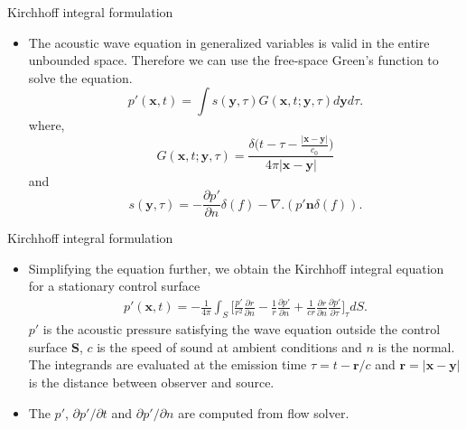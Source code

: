 \documentclass[10pt, aspectratio=169]{beamer}
\begin{document}
\begin{frame}{Kirchhoff integral formulation}
	\begin{itemize}
		\item The acoustic wave equation in generalized variables is valid in the
		entire unbounded space. Therefore we can use the free-space Green’s function to
		solve the equation.
		\begin{equation}\label{pressure}
			p'(\mathbf{x}, t) = \int s(\mathbf{y}, \tau){G(\mathbf{x}, t; \mathbf{y}, \tau )} d\mathbf{y}d\tau.
		\end{equation}
		where,
		\begin{equation}\label{Green's Function}
			G(\mathbf{x}, t; \mathbf{y}, \tau ) = \frac{\delta \Big(t - \tau - \frac{|\mathbf{x} - \mathbf{y}|}{c_{0}}\Big)}{4\pi|\mathbf{x} - \mathbf{y}|}
		\end{equation}
		and 
		\begin{equation}
			s(\mathbf{y}, \tau) = -\frac{\partial p'}{\partial n}\delta(f) - \nabla.(p' \mathbf{n} \delta(f)).
		\end{equation}
	\end{itemize}
\end{frame}

\begin{frame}{Kirchhoff integral formulation}
	\begin{itemize}
		\item Simplifying the equation further, we obtain the Kirchhoff integral equation for a stationary control surface
		\begin{equation}
			\begin{split}
				p'(\mathbf{x}, t) = -\frac{1}{4\pi}\int_{S}\Big[  \frac{p'}{r^{2}}\frac{\partial r}{\partial n} - \frac{1}{r}\frac{\partial p'}{\partial n} + \frac{1}{c r}\frac{\partial r}{\partial n}\frac{\partial p'}{\partial \tau} \Big]_{\tau} dS.
			\end{split} 
		\end{equation}
		$p'$ is the acoustic pressure satisfying the wave equation outside the control surface \textbf{S}, $c$ is the speed of sound at ambient conditions and $n$ is the normal.
		The integrands are evaluated at the emission time $\tau = t - \mathbf{r}/c$ and $\mathbf{r}= |\mathbf{x} - \mathbf{y}|$ is the distance between observer and source.
		\item The $p'$, ${\partial p'}/{\partial t}$ and ${\partial p'}/{\partial n}$ are computed from flow solver.
	\end{itemize}
\end{frame}
\end{document}
